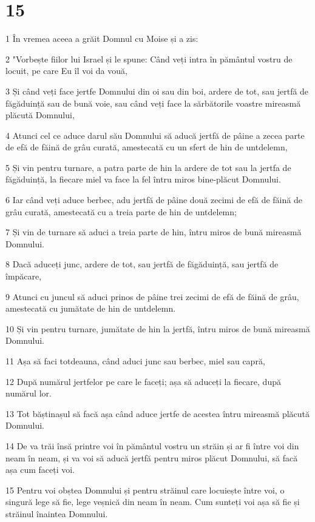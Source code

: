 \chapter{15}

\par 1 În vremea aceea a grăit Domnul cu Moise și a zis:
\par 2 "Vorbește fiilor lui Israel și le spune: Când veți intra în pământul vostru de locuit, pe care Eu îl voi da vouă,
\par 3 Și când veți face jertfe Domnului din oi sau din boi, ardere de tot, sau jertfă de făgăduință sau de bună voie, sau când veți face la sărbătorile voastre mireasmă plăcută Domnului,
\par 4 Atunci cel ce aduce darul său Domnului să aducă jertfă de pâine a zecea parte de efă de făină de grâu curată, amestecată cu un sfert de hin de untdelemn,
\par 5 Și vin pentru turnare, a patra parte de hin la ardere de tot sau la jertfa de făgăduință, la fiecare miel va face la fel întru miros bine-plăcut Domnului.
\par 6 Iar când veți aduce berbec, adu jertfă de pâine două zecimi de efă de făină de grâu curată, amestecată cu a treia parte de hin de untdelemn;
\par 7 Și vin de turnare să aduci a treia parte de hin, întru miros de bună mireasmă Domnului.
\par 8 Dacă aduceți junc, ardere de tot, sau jertfă de făgăduință, sau jertfă de împăcare,
\par 9 Atunci cu juncul să aduci prinos de pâine trei zecimi de efă de făină de grâu, amestecată cu jumătate de hin de untdelemn.
\par 10 Și vin pentru turnare, jumătate de hin la jertfă, întru miros de bună mireasmă Domnului.
\par 11 Așa să faci totdeauna, când aduci junc sau berbec, miel sau capră,
\par 12 După numărul jertfelor pe care le faceți; așa să aduceți la fiecare, după numărul lor.
\par 13 Tot băștinașul să facă așa când aduce jertfe de acestea întru mireasmă plăcută Domnului.
\par 14 De va trăi însă printre voi în pământul vostru un străin și ar fi între voi din neam în neam, și va voi să aducă jertfă pentru miros plăcut Domnului, să facă așa cum faceți voi.
\par 15 Pentru voi obștea Domnului și pentru străinul care locuiește între voi, o singură lege să fie, lege veșnică din neam în neam. Cum sunteți voi așa să fie și străinul înaintea Domnului.

